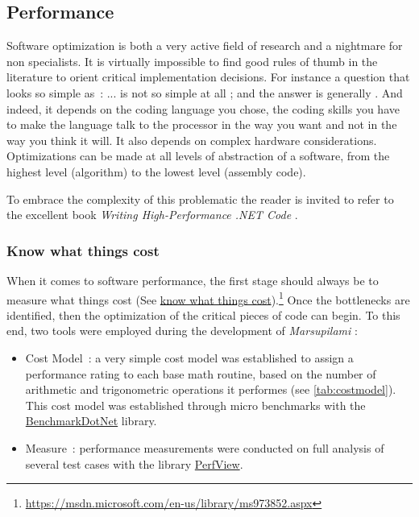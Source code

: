 \subsection{Performance}
Software optimization is both a very active field of research and a nightmare for non specialists. It is virtually impossible to find good rules of thumb in the literature to orient critical implementation decisions. For instance a question that looks so simple as~:  ... is not so simple at all ; and the answer is generally . And indeed, it depends on the coding language you chose, the coding skills you have to make the language talk to the processor in the way you want and not in the way you think it will. It also depends on complex hardware considerations. Optimizations can be made at all levels of abstraction of a software, from the highest level (algorithm) to the lowest level (assembly code).

To embrace the complexity of this problematic the reader is invited to refer to the excellent book \emph{Writing High-Performance .NET Code} \cite{Watson2014}.

\subsubsection{Know what things cost}
When it comes to software performance, the first stage should always be to measure what things cost (See \href{https://msdn.microsoft.com/en-us/library/ms973852.aspx}{know what things cost}).\footnote{\url{https://msdn.microsoft.com/en-us/library/ms973852.aspx}} Once the bottlenecks are identified, 
then the optimization of the critical pieces of code can begin. To this end, two tools were employed during the development of \emph{Marsupilami} :
\begin{itemize}
\item Cost Model~: a very simple cost model was established to assign a performance rating to each base math routine, based on the number of arithmetic and trigonometric  operations it performes (see \cref{tab:costmodel}). This cost model was established through micro benchmarks with the \href{https://github.com/Microsoft/perfview}{BenchmarkDotNet} library.
\item Measure~: performance measurements were conducted on full analysis of several test cases with the library \href{https://github.com/Microsoft/perfview}{PerfView}. 
\end{itemize}

